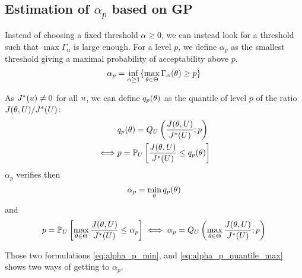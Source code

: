 \documentclass[../../Main_ManuscritThese.tex]{subfiles}
\begin{document}




\subsection{Estimation of $\alpha_p$ based on GP}
Instead of choosing a fixed threshold $\alpha \geq 0$, we can instead look for a threshold such that $\max \Gamma_{\alpha}$ is large enough.
For a level $p$, we define $\alpha_p$ as the smallest threshold giving a maximal probability of acceptability above $p$.
\begin{equation}
  \alpha_p = \inf_{\alpha \geq 1}\{\max_{\theta \in \Theta}\Gamma_{\alpha}(\theta)\geq p \}
\end{equation}

As $J^*(u) \neq 0$ for all $u$, we can define $q_{p}(\theta)$ as the quantile of level $p$ of the ratio $J(\theta, U) / J^*(U)$:
\begin{align}
       & q_{p}(\theta) = Q_{U}\left(\frac{J(\theta, U)}{J^*(U)};p\right) \\
  \iff &p          = \mathbb{P}_{U}\left[\frac{J(\theta, U)}{J^*(U)} \leq q_{p}(\theta)\right]
\end{align}
$\alpha_p$ verifies then
\begin{equation}
  \label{eq:alpha_p_min}
\alpha_p = \min_{\theta} q_p(\theta)
\end{equation}
and 
\begin{equation}
  \label{eq:alpha_p_quantile_max}
  p = \mathbb{P}_{U}\left[\max_{\theta \in \Theta}\frac{J(\theta, U)}{J^*(U)} \leq \alpha_p\right] \iff \alpha_p = Q_{U}\left(\max_{\theta\in\Theta} \frac{J(\theta,U)}{J^*(U)};p\right)
\end{equation}

Those two formulations \cref{eq:alpha_p_min}, and \cref{eq:alpha_p_quantile_max} shows two ways of getting to $\alpha_p$.
\end{document}
